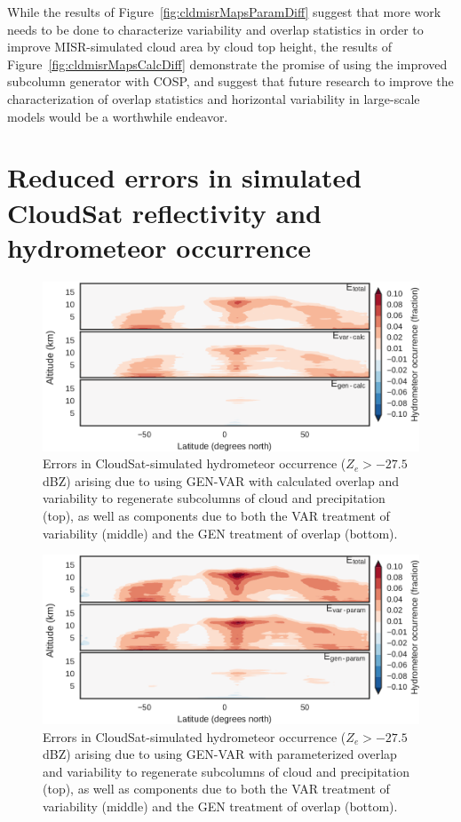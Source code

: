 While the results of Figure~\ref{fig:cldmisrMapsParamDiff} suggest that
more work needs to be done to characterize variability and overlap
statistics in order to improve MISR-simulated cloud area by cloud top
height, the results of Figure~\ref{fig:cldmisrMapsCalcDiff} demonstrate
the promise of using the improved subcolumn generator with COSP, and
suggest that future research to improve the characterization of overlap
statistics and horizontal variability in large-scale models would be a
worthwhile endeavor.

\section{Reduced errors in simulated CloudSat reflectivity and
hydrometeor occurrence}\label{sec:subgrid2Active}

\begin{figure}[htbp]
\centering
\includegraphics{graphics/subgrid2_hfba_zonal_gen-var-calc_diff.pdf}
\caption{\label{fig:hfbaZonalCalcDiff}Errors in CloudSat-simulated
hydrometeor occurrence (\(Z_e > -27.5\) dBZ) arising due to using
GEN-VAR with calculated overlap and variability to regenerate subcolumns
of cloud and precipitation (top), as well as components due to both the
VAR treatment of variability (middle) and the GEN treatment of overlap
(bottom).}\label{fig:hfbaZonalCalcDiff}
\end{figure}

\begin{figure}[htbp]
\centering
\includegraphics{graphics/subgrid2_hfba_zonal_gen-var-param_diff.pdf}
\caption{\label{fig:hfbaZonalParamDiff}Errors in CloudSat-simulated
hydrometeor occurrence (\(Z_e > -27.5\) dBZ) arising due to using
GEN-VAR with parameterized overlap and variability to regenerate
subcolumns of cloud and precipitation (top), as well as components due
to both the VAR treatment of variability (middle) and the GEN treatment
of overlap (bottom).}\label{fig:hfbaZonalParamDiff}
\end{figure}

